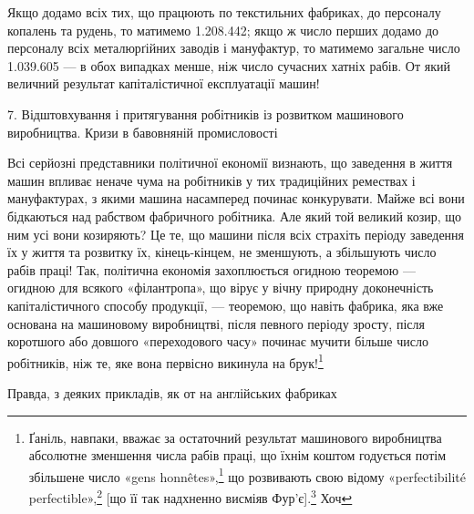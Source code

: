 Якщо додамо всіх тих, що працюють по текстильних фабриках,
до персоналу копалень та рудень, то матимемо 1.208.442;
якщо ж число перших додамо до персоналу всіх металюрґійних
заводів і мануфактур, то матимемо загальне число 1.039.605 —
в обох випадках менше, ніж число сучасних хатніх рабів. От
який величний результат капіталістичної експлуатації машин!

7. Відштовхування і притягування робітників із розвитком
машинового виробництва. Кризи в бавовняній промисловості

Всі серйозні представники політичної економії визнають,
що заведення в життя машин впливає неначе чума на робітників
у тих традиційних ремествах і мануфактурах, з якими машина
насамперед починає конкурувати. Майже всі вони бідкаються
над рабством фабричного робітника. Але який той великий козир,
що ним усі вони козиряють? Це те, що машини після всіх страхіть
періоду заведення їх у життя та розвитку їх, кінець-кінцем,
не зменшують, а збільшують число рабів праці! Так, політична
економія захоплюється огидною теоремою — огидною для всякого
«філантропа», що вірує у вічну природну доконечність капіталістичного
способу продукції, — теоремою, що навіть фабрика,
яка вже основана на машиновому виробництві, після певного
періоду зросту, після коротшого або довшого «переходового
часу» починає мучити більше число робітників, ніж те, яке вона
первісно викинула на брук!\footnote{
Ґаніль, навпаки, вважає за остаточний результат машинового виробництва
абсолютне зменшення числа рабів праці, що їхнім коштом годується
потім збільшене число «gens honnêtes»,\footnote*{
— порядних людей. Ред.
} що розвивають свою відому
«perfectibilité perfectible»,\footnote*{
— здібну вдосконалюватися здібність до вдосконалення. Ред.
} [що її так надхненно висміяв Фур’є].\footnote*{
Заведений у прямі дужки кінець речення беремо з французького
видання. Ред.
} Хоч
}

Правда, з деяких прикладів, як от на англійських фабриках

